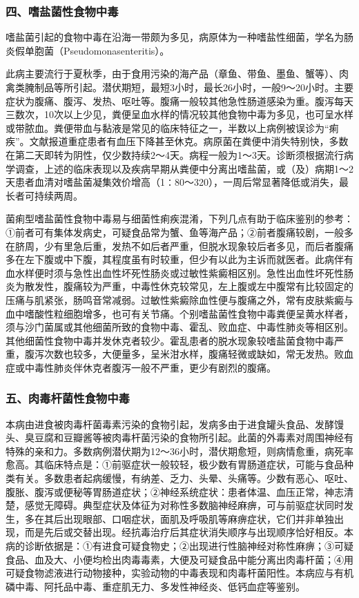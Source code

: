 \subsubsection{四、嗜盐菌性食物中毒}

嗜盐菌引起的食物中毒在沿海一带颇为多见，病原体为一种嗜盐性细菌，学名为肠炎假单胞菌（Pseudomonasenteritis）。

此病主要流行于夏秋季，由于食用污染的海产品（章鱼、带鱼、墨鱼、蟹等）、肉禽类腌制品等所引起。潜伏期短，最短3小时，最长26小时，一般9～20小时。主要症状为腹痛、腹泻、发热、呕吐等。腹痛一般较其他急性肠道感染为重。腹泻每天三数次，10次以上少见，粪便呈血水样的情况较其他食物中毒为多见，也可呈水样或带脓血。粪便带血与黏液是常见的临床特征之一，半数以上病例被误诊为“痢疾”。文献报道重症患者有血压下降甚至休克。病原菌在粪便中消失特别快，多数在第二天即转为阴性，仅少数持续2～4天。病程一般为1～3天。诊断须根据流行病学调查，上述的临床表现以及疾病早期从粪便中分离出嗜盐菌，或（及）病期1～2天患者血清对嗜盐菌凝集效价增高（1∶80～320），一周后常显著降低或消失，最长者可持续两周。

菌痢型嗜盐菌性食物中毒易与细菌性痢疾混淆，下列几点有助于临床鉴别的参考：①前者可有集体发病史，可疑食品常为蟹、鱼等海产品；②前者腹痛较剧，一般多在脐周，少有里急后重，发热不如后者严重，但脱水现象较后者多见，而后者腹痛多在左下腹或中下腹，其程度虽有时较重，但少有以此为主诉而就医者。此病伴有血水样便时须与急性出血性坏死性肠炎或过敏性紫癜相区别。急性出血性坏死性肠炎为散发性，腹痛较为严重，中毒性休克较常见，左上腹或左中腹常有比较固定的压痛与肌紧张，肠鸣音常减弱。过敏性紫癜除血性便与腹痛之外，常有皮肤紫癜与血中嗜酸性粒细胞增多，也可有关节痛。个别嗜盐菌性食物中毒粪便呈黄水样者，须与沙门菌属或其他细菌所致的食物中毒、霍乱、败血症、中毒性肺炎等相区别。其他细菌性食物中毒并发休克者较少。霍乱患者的脱水现象较嗜盐菌食物中毒严重，腹泻次数也较多，大便量多，呈米泔水样，腹痛轻微或缺如，常无发热。败血症或中毒性肺炎伴休克者腹泻一般不严重，更少有剧烈的腹痛。

\subsubsection{五、肉毒杆菌性食物中毒}

本病由进食被肉毒杆菌毒素污染的食物引起，发病多由于进食罐头食品、发酵馒头、臭豆腐和豆瓣酱等被肉毒杆菌污染的食物所引起。此菌的外毒素对周围神经有特殊的亲和力。多数病例潜伏期为12～36小时，潜伏期愈短，则病情愈重，病死率愈高。其临床特点是：①前驱症状一般较轻，极少数有胃肠道症状，可能与食品种类有关。多数患者起病缓慢，有纳差、乏力、头晕、头痛等。少数有恶心、呕吐、腹胀、腹泻或便秘等胃肠道症状；②神经系统症状：患者体温、血压正常，神志清楚，感觉无障碍。典型症状及体征为对称性多数脑神经麻痹，可与前驱症状同时发生，多在其后出现眼部、口咽症状，面肌及呼吸肌等麻痹症状，它们并非单独出现，而是先后或交替出现。经抗毒治疗后其症状消失顺序与出现顺序恰好相反。本病的诊断依据是：①有进食可疑食物史；②出现进行性脑神经对称性麻痹；③可疑食品、血及大、小便均检出肉毒毒素，大便及可疑食品中能分离出肉毒杆菌；④用可疑食物滤液进行动物接种，实验动物的中毒表现和肉毒杆菌阳性。本病应与有机磷中毒、阿托品中毒、重症肌无力、多发性神经炎、低钙血症等鉴别。

